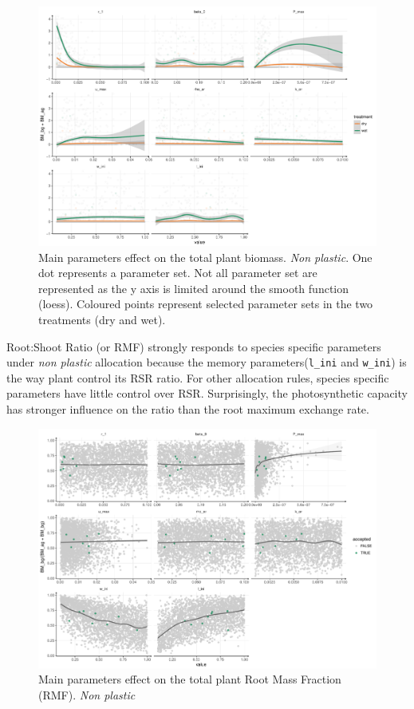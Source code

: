 \begin{figure}\label{fig:sensitivity_BM}
\includegraphics[width = \textwidth]{./2_PP/Figures/par_effect_none_BM.pdf}
\caption{Main parameters effect on the total plant biomass. \textit{Non plastic}. One dot represents a parameter set. Not all parameter set are represented as the y axis is limited around the smooth function (loess). Coloured points represent selected parameter sets in the two treatments (\textcolor{myOrange}{dry} and \textcolor{myGreen}{wet}).}
\end{figure}

Root:Shoot Ratio (or RMF) strongly responds to species specific parameters under \textit{non plastic} allocation because the memory parameters(\texttt{l\_ini} and \texttt{w\_ini}) is the way plant control its RSR ratio. For other allocation rules, species specific parameters have little control over RSR. Surprisingly, the photosynthetic capacity has stronger influence on the ratio than the root maximum exchange rate.


\begin{figure}\label{fig:sensitivity_RSR}
\includegraphics[width = \textwidth]{./2_PP/Figures/par_effect_none_RSR.pdf}
\caption{Main parameters effect on the total plant Root Mass Fraction (RMF). \textit{Non plastic}}
\end{figure}

